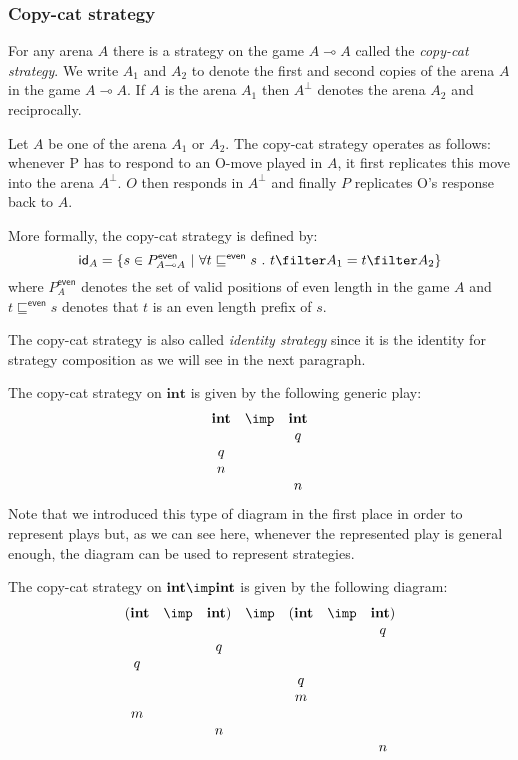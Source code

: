 \subsubsection{Copy-cat strategy}

For any arena $A$ there is a strategy on the game $A \multimap A$
called the \emph{copy-cat strategy}. We write $A_1$ and $A_2$ to
denote the first and second copies of the arena $A$ in the game $A
\multimap A$. If $A$ is the arena $A_1$ then $A^\perp$ denotes the
arena $A_2$ and reciprocally.

Let $A$ be one of the arena $A_1$ or $A_2$. The copy-cat strategy
operates as follows: whenever P has to respond to an O-move played
in $A$, it first replicates this move into the arena $A^{\perp}$.
$O$ then responds in $A^{\perp}$ and finally $P$ replicates O's
response back to $A$.


More formally, the copy-cat strategy is defined by:
$$ \textsf{id}_A = \{ s \in P^{\textsf{even}}_{A \multimap A} \ | \ \forall t \sqsubseteq^{\textsf{even}} s\ .\ t \filter A_1 = t \filter A_2 \}$$
where $P^{\textsf{even}}_A$ denotes the set of valid positions of
even length in the game $A$ and $t \sqsubseteq^{\textsf{even}} s$
denotes that $t$ is an even length prefix of $s$.

The copy-cat strategy is also called \emph{identity strategy} since
it is the identity for strategy composition as we will see in the
next paragraph.

\begin{example} The copy-cat strategy on $\textbf{int}$ is given by the following generic play:
$$\begin{array}{ccc}
\textbf{int} & \imp & \textbf{int} \\
&& q\\
q \\
n \\
&& n
\end{array}
$$
Note that we introduced this type of diagram in the first place in
order to represent plays but, as we can see here, whenever the
represented play is general enough, the diagram can be used to
represent strategies.

The copy-cat strategy on $\textbf{int} \imp \textbf{int}$ is given
by the following diagram:
$$\begin{array}{ccccccc}
(\textbf{int} & \imp & \textbf{int}) & \imp & (\textbf{int} & \imp & \textbf{int}) \\
&&&& && q\\
&& q\\
q \\
&&&& q \\
&&&& m \\
m\\
&& n \\
&&&& && n
\end{array}$$
\end{example}


